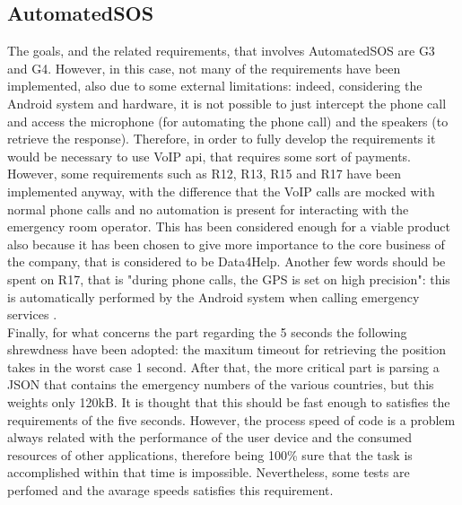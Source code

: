 \subsection{AutomatedSOS}
The goals, and the related requirements, that involves AutomatedSOS are G3 and G4. 
However, in this case, not many of the requirements have been implemented, also due to some external limitations: indeed, considering
the Android system and hardware, it is not possible to just intercept the phone call and access the microphone (for automating the phone call)
and the speakers (to retrieve the response). 
Therefore, in order to fully develop the requirements it would be necessary to use VoIP api, that requires some sort of payments.
However, some requirements such as R12, R13, R15 and R17 have been implemented anyway, with the difference that the VoIP calls are mocked
with normal phone calls and no automation is present for interacting with the emergency room operator. 
This has been considered enough for a viable product also because it has been chosen to give more importance to the core business of the 
company, that is considered to be Data4Help. 
Another few words should be spent on R17, that is "during phone calls, the GPS is set on high precision": this is automatically performed
by the Android system when calling emergency services \cite{androidELS}. \\
Finally, for what concerns the part regarding the 5 seconds the following shrewdness have been adopted: the maxitum timeout for retrieving 
the position takes in the worst case 1 second. 
After that, the more critical part is parsing a JSON that contains the emergency numbers of the various countries, but this weights only
120kB. 
It is thought that this should be fast enough to satisfies the requirements of the five seconds. 
However, the process speed of code is a problem always related with the performance of the user device and the consumed resources of other 
applications, therefore being 100\% sure that the task is accomplished within that time is impossible. Nevertheless, some tests are perfomed
and the avarage speeds satisfies this requirement.

